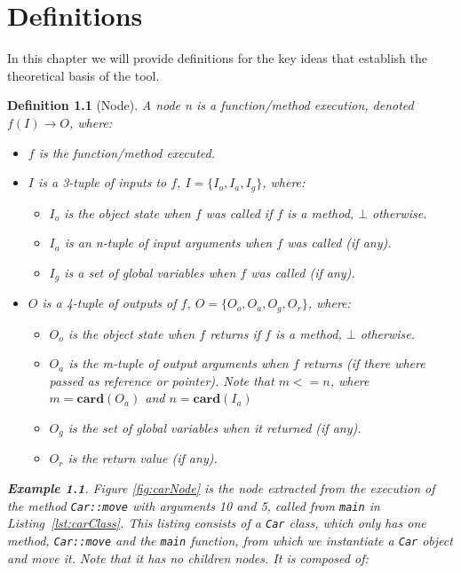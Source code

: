 \chapter{Definitions}
\label{cap:definiciones}
\newtheorem{definition}{Definition}
\newtheorem{exmp}{Example}

In this chapter we will provide definitions for the key ideas that establish the theoretical basis of the tool.

\begin{definition}[Node]
A node n is a function/method execution, denoted \(f(I) \to O\), where:
\begin{itemize}
\item \(f\) is the function/method executed.
\item \(I\) is a 3-tuple of inputs to \(f\), \(I = \{I_o, I_a, I_g\}\), where:
\begin{itemize}
\item \(I_o\) is the object state when \(f\) was called if \(f\) is a method, $\bot$ otherwise.
\item \(I_a\) is an n-tuple of input arguments when \(f\) was called (if any).
\item \(I_g\) is a set of global variables when \(f\) was called (if any).
\end{itemize}
\item \(O\) is a 4-tuple of outputs of \(f\), \(O = \{O_o, O_a, O_g, O_r\}\), where:
\begin{itemize}
\item \(O_o\) is the object state when \(f\) returns if \(f\) is a method, $\bot$ otherwise.
\item \(O_a\) is the m-tuple of output arguments when \(f\) returns (if there where passed as reference or pointer). Note that \(m <= n\), where $m=\mathbf{card}(O_a)$ and $n=\mathbf{card}(I_a)$
\item \(O_g\) is the set of global variables when it returned (if any).
\item \(O_r\) is the return value (if any).
\end{itemize}
\end{itemize}

\begin{exmp}
Figure \ref{fig:carNode} is the node extracted from the execution of the method \verb|Car::move| with arguments 10 and 5, called from \verb|main| in Listing~\ref{lst:carClass}. This listing consists of a \verb|Car| class, which only has one method, \verb|Car::move| and the \verb|main| function, from which we instantiate a \verb|Car| object and move it. Note that it has no children nodes. It is composed of:


\end{exmp}
\end{definition}

